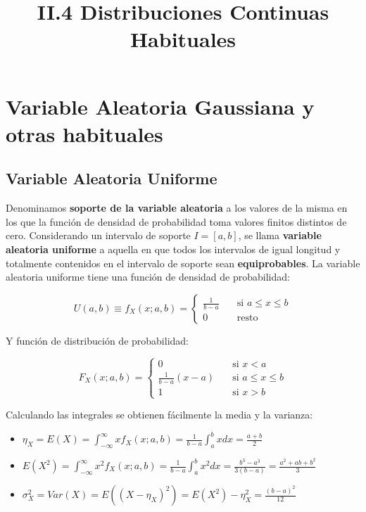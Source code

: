 \documentclass[11pt]{article}
\title{II.4 Distribuciones Continuas Habituales}
\providecommand{\tightlist}{%
      \setlength{\itemsep}{0pt}\setlength{\parskip}{0pt}}
\begin{document}
    
    
    \maketitle
    
    

    
    \hypertarget{ii.4-variable-aleatoria-gaussiana-y-otras-habituales}{%
\section*{Variable Aleatoria Gaussiana y otras
habituales}\label{ii.4-variable-aleatoria-gaussiana-y-otras-habituales}}

\hypertarget{variable-aleatoria-uniforme}{%
\subsection*{Variable Aleatoria
Uniforme}\label{variable-aleatoria-uniforme}}

Denominamos \textbf{soporte de la variable aleatoria} a los valores de
la misma en los que la función de densidad de probabilidad toma valores
finitos distintos de cero. Considerando un intervalo de soporte
\(I = [a, b]\), se llama \textbf{variable aleatoria uniforme} a aquella
en que todos los intervalos de igual longitud y totalmente contenidos en
el intervalo de soporte sean \textbf{equiprobables}. La variable
aleatoria uniforme tiene una función de densidad de probabilidad:

\[
U(a,b) \equiv f_X(x;a,b) =
\begin{cases}
    \frac{1}{b-a} & \quad \text{si } a\leq x \leq b\\
    0             & \quad \text{resto }
\end{cases}
\]

Y función de distribución de probabilidad:

\[
F_X(x;a,b) =
\begin{cases}
    0                   & \quad \text{si } x < a \\
    \frac{1}{b-a} (x-a) & \quad \text{si } a\leq x \leq b\\
    1                   & \quad \text{si } x > b
\end{cases}
\]

    Calculando las integrales se obtienen fácilmente la media y la varianza:

\begin{itemize}
\tightlist
\item
  \(\eta_X = E(X) = \int_{-\infty}^{\infty} xf_X(x;a,b)= \frac{1}{b-a}\int_a^bxdx=\frac{a+b}{2}\)
\item
  \(E(X^2)= \int_{-\infty}^{\infty} x^2f_X(x;a,b)= \frac{1}{b-a}\int_a^bx^2dx=\frac{b^3-a^3}{3(b-a)}= \frac{a^2+ab+b^2}{3}\)
\item
  \(\sigma_X^2 = Var(X) = E((X-\eta_X)^2) = E(X^2)-\eta_X^2=\frac{(b-a)^2}{12}\)
\end{itemize}
\end{document}
